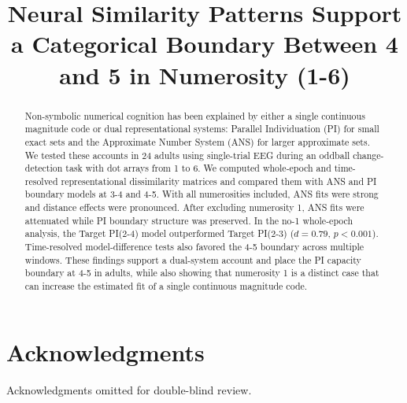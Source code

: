 \documentclass{ccn}
\title{Neural Similarity Patterns Support a Categorical Boundary Between 4 and 5 in Numerosity (1-6)}
\author{}
\begin{document}

\maketitle

\begin{abstract}
Non-symbolic numerical cognition has been explained by either a single continuous magnitude code or dual representational systems: Parallel Individuation (PI) for small exact sets and the Approximate Number System (ANS) for larger approximate sets. We tested these accounts in 24 adults using single-trial EEG during an oddball change-detection task with dot arrays from 1 to 6. We computed whole-epoch and time-resolved representational dissimilarity matrices and compared them with ANS and PI boundary models at 3-4 and 4-5. With all numerosities included, ANS fits were strong and distance effects were pronounced. After excluding numerosity 1, ANS fits were attenuated while PI boundary structure was preserved. In the no-1 whole-epoch analysis, the Target PI(2-4) model outperformed Target PI(2-3) ($d = 0.79$, $p < 0.001$). Time-resolved model-difference tests also favored the 4-5 boundary across multiple windows. These findings support a dual-system account and place the PI capacity boundary at 4-5 in adults, while also showing that numerosity 1 is a distinct case that can increase the estimated fit of a single continuous magnitude code.
\end{abstract}






\section{Acknowledgments}
\begin{center}
Acknowledgments omitted for double-blind review.
\end{center}

\printbibliography

\end{document}
